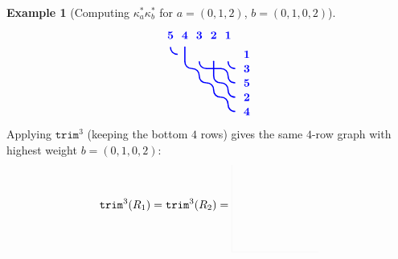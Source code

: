 \documentclass{amsart}
\theoremstyle{definition}
\newtheorem{example}[lemma]{Example}
\theoremstyle{remark}
\numberwithin{equation}{subsection}
\newcommand{\trm}{\mathtt{trim}}
\begin{document}
\begin{example}[Computing $\kappa_a^*\kappa_b^*$ for $a=(0,1,2)$, $b=(0,1,0,2)$]
$$\begin{tikzpicture}[scale=0.45, baseline=(current bounding box.center)]
  \draw[blue, line width=1.125pt, line cap=round] (1.5,4) -- (1.5,5);
  \draw[blue, line width=1.125pt] (1,4.5) .. controls (0.7,4.5) and (0.5,4.7) .. (0.5,5);
  \draw[blue, line width=1.125pt] (5,3.5) .. controls (4.7,3.5) and (4.5,3.7) .. (4.5,4);
  \draw[blue, line width=1.125pt] (4.5,3) .. controls (4.5,3.3) and (4.3,3.5) .. (4,3.5);
  \draw[blue, line width=1.125pt, line cap=round] (4,3.5) -- (3,3.5);
  \draw[blue, line width=1.125pt, line cap=round] (3.5,3) -- (3.5,4);
  \draw[blue, line width=1.125pt] (3,3.5) .. controls (2.7,3.5) and (2.5,3.7) .. (2.5,4);
  \draw[blue, line width=1.125pt] (2.5,3) .. controls (2.5,3.3) and (2.3,3.5) .. (2,3.5);
  \draw[blue, line width=1.125pt] (2,3.5) .. controls (1.7,3.5) and (1.5,3.7) .. (1.5,4);
  \draw[blue, line width=1.125pt] (5,2.5) .. controls (4.7,2.5) and (4.5,2.7) .. (4.5,3);
  \draw[blue, line width=1.125pt] (4.5,2) .. controls (4.5,2.3) and (4.3,2.5) .. (4,2.5);
  \draw[blue, line width=1.125pt] (4,2.5) .. controls (3.7,2.5) and (3.5,2.7) .. (3.5,3);
  \draw[blue, line width=1.125pt] (3.5,2) .. controls (3.5,2.3) and (3.3,2.5) .. (3,2.5);
  \draw[blue, line width=1.125pt] (3,2.5) .. controls (2.7,2.5) and (2.5,2.7) .. (2.5,3);
  \draw[blue, line width=1.125pt] (5,1.5) .. controls (4.7,1.5) and (4.5,1.7) .. (4.5,2);
  \draw[blue, line width=1.125pt] (4.5,1) .. controls (4.5,1.3) and (4.3,1.5) .. (4,1.5);
  \draw[blue, line width=1.125pt] (4,1.5) .. controls (3.7,1.5) and (3.5,1.7) .. (3.5,2);
  \draw[blue, line width=1.125pt] (5,0.5) .. controls (4.7,0.5) and (4.5,0.7) .. (4.5,1);
  \node[font=\bfseries, text=blue, anchor=south] at (4.5,5.3) {1};
  \node[font=\bfseries, text=blue, anchor=south] at (3.5,5.3) {2};
  \node[font=\bfseries, text=blue, anchor=south] at (2.5,5.3) {3};
  \node[font=\bfseries, text=blue, anchor=south] at (1.5,5.3) {4};
  \node[font=\bfseries, text=blue, anchor=south] at (0.5,5.3) {5};
  \node[font=\bfseries, text=blue, anchor=west] at (5.3,4.5) {1};
  \node[font=\bfseries, text=blue, anchor=west] at (5.3,3.5) {3};
  \node[font=\bfseries, text=blue, anchor=west] at (5.3,2.5) {5};
  \node[font=\bfseries, text=blue, anchor=west] at (5.3,1.5) {2};
  \node[font=\bfseries, text=blue, anchor=west] at (5.3,0.5) {4};
\end{tikzpicture}
$$
Applying $\trm^3$ (keeping the bottom $4$ rows) gives the same $4$-row graph with highest weight $b=(0,1,0,2)$:
$$\trm^3(R_1)=\trm^3(R_2)=
\begin{tikzpicture}[scale=0.45, baseline=(current bounding box.center)]
  \draw[lightgray, very thin, opacity=0.3] (0,0) -- (6,0);
  \draw[lightgray, very thin, opacity=0.3] (0,0) -- (0,6);

\end{tikzpicture}$$
\end{example}
\end{document}
